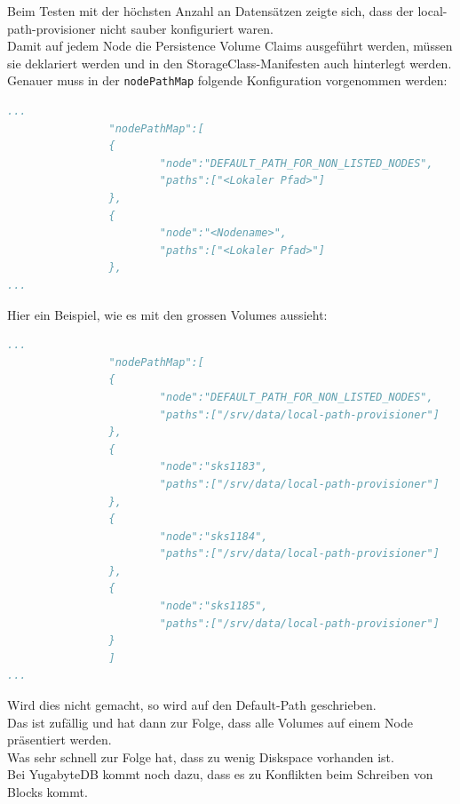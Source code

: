 \begin{flushleft}
    Beim Testen mit der höchsten Anzahl an Datensätzen zeigte sich, dass der \gls{local-path-provisioner} nicht sauber konfiguriert waren.\\
    Damit auf jedem Node die Persistence Volume Claims ausgeführt werden, müssen sie deklariert werden und in den StorageClass-Manifesten auch hinterlegt werden.\\
    Genauer muss in der \texttt{nodePathMap} folgende Konfiguration vorgenommen werden:
\lstset{style=gra_codestyle}
\begin{lstlisting}[language=yaml, caption=local-path-provisioner nodePathMap,captionpos=b,label={lst:local-path-provisioner_nodePathMap},breaklines=true]
...
                "nodePathMap":[
                {
                        "node":"DEFAULT_PATH_FOR_NON_LISTED_NODES",
                        "paths":["<Lokaler Pfad>"]
                },
                {
                        "node":"<Nodename>",
                        "paths":["<Lokaler Pfad>"]
                },
...
\end{lstlisting}
    Hier ein Beispiel, wie es mit den grossen Volumes aussieht:
\lstset{style=gra_codestyle}
\begin{lstlisting}[language=yaml, caption=local-path-provisioner nodePathMap Beispiel,captionpos=b,label={lst:local-path-provisioner_nodePathMap-exampl},breaklines=true]
...
                "nodePathMap":[
                {
                        "node":"DEFAULT_PATH_FOR_NON_LISTED_NODES",
                        "paths":["/srv/data/local-path-provisioner"]
                },
                {
                        "node":"sks1183",
                        "paths":["/srv/data/local-path-provisioner"]
                },
                {
                        "node":"sks1184",
                        "paths":["/srv/data/local-path-provisioner"]
                },
                {
                        "node":"sks1185",
                        "paths":["/srv/data/local-path-provisioner"]
                }
                ]
...
\end{lstlisting}
    Wird dies nicht gemacht, so wird auf den Default-Path geschrieben.\\
    Das ist zufällig und hat dann zur Folge, dass alle Volumes auf einem Node präsentiert werden.\\
    Was sehr schnell zur Folge hat, dass zu wenig Diskspace vorhanden ist.\\
    Bei YugabyteDB kommt noch dazu, dass es zu Konflikten beim Schreiben von Blocks kommt.
\end{flushleft}
